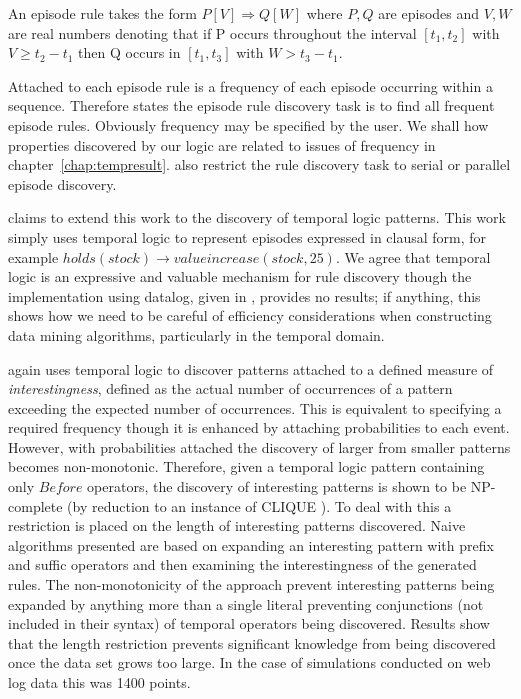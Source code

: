 \begin{definition}
\begin{rm}
An episode rule takes the form $P[V] \Rightarrow Q[W]$ where $P,Q$ are
episodes and $V,W$ are real numbers denoting that if P occurs
throughout the interval $[t_1,t_2]$ with $V \ge t_2 - t_1$ then Q
occurs in $[t_1,t_3]$ with $W > t_3 - t_1$.
\end{rm}
\end{definition}

Attached to each episode rule is a frequency of each episode occurring
within a sequence. Therefore \cite{mt96} states the episode rule
discovery task is to find all frequent episode rules. Obviously
frequency may be specified by the user. We shall how properties
discovered by our logic are related to issues of frequency in
chapter~\ref{chap:tempresult}. \cite{mt96} also restrict the rule
discovery task to serial or parallel episode discovery.

\medskip

\cite{pt96} claims to extend this work to the discovery of temporal
logic patterns. This work simply uses temporal logic to represent
episodes expressed in clausal form, for example $holds(stock) \to
valueincrease(stock,25)$. We agree that temporal logic is an
expressive and valuable mechanism for rule discovery though the
implementation using datalog, given in \cite{pt96}, provides no
results; if anything, this shows how we need to be careful of
efficiency considerations when constructing data mining algorithms,
particularly in the temporal domain.

\medskip

\cite{bt98} again uses temporal logic to discover patterns attached to
a defined measure of {\em interestingness}, defined as the actual
number of occurrences of a pattern exceeding the expected number of
occurrences. This is equivalent to specifying a required frequency
though it is enhanced by attaching probabilities to each event.
However, with probabilities attached the discovery of  larger from smaller
patterns becomes non-monotonic. Therefore, given a temporal logic
pattern containing only $Before$ operators, the discovery of
interesting patterns is shown to be NP-complete (by reduction to an
instance of CLIQUE \cite{gj79}). To deal with this a
restriction is placed on the length of interesting patterns
discovered.  Naive algorithms presented are based on expanding an
interesting pattern with prefix and suffic operators and then
examining the interestingness of the generated rules. The
non-monotonicity of the approach prevent interesting patterns being
expanded by anything more than a single literal preventing
conjunctions (not included in their syntax) of temporal operators
being discovered. Results show that the length restriction prevents
significant knowledge from being discovered once the data set grows
too large. In the case of simulations conducted on web log data this
was 1400 points.


